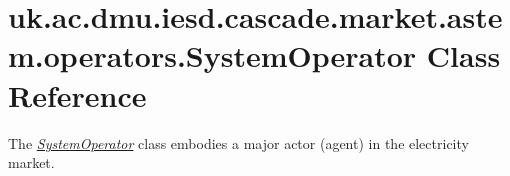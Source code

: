 \hypertarget{classuk_1_1ac_1_1dmu_1_1iesd_1_1cascade_1_1market_1_1astem_1_1operators_1_1_system_operator}{\section{uk.\-ac.\-dmu.\-iesd.\-cascade.\-market.\-astem.\-operators.\-System\-Operator Class Reference}
\label{classuk_1_1ac_1_1dmu_1_1iesd_1_1cascade_1_1market_1_1astem_1_1operators_1_1_system_operator}
}


The {\itshape \hyperlink{classuk_1_1ac_1_1dmu_1_1iesd_1_1cascade_1_1market_1_1astem_1_1operators_1_1_system_operator}{System\-Operator}} class embodies a major actor (agent) in the electricity market.  


